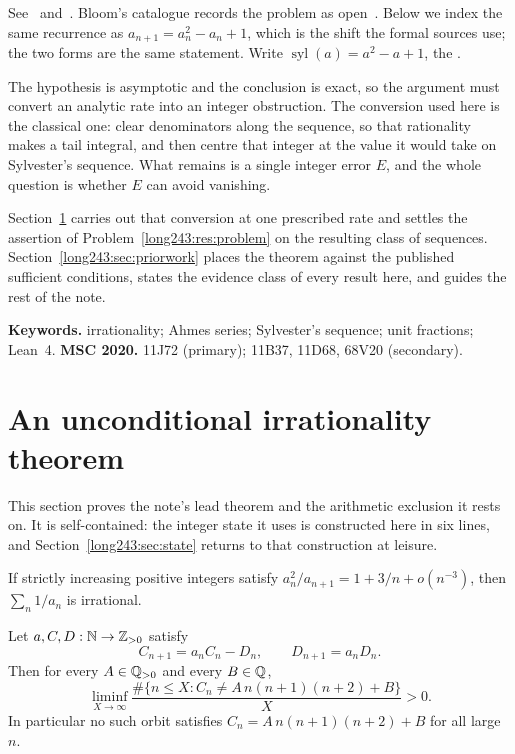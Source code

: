\documentclass[11pt]{article}
\newcommand{\sylnext}{\operatorname{syl}}
\begin{document}
\noindent See~\cite[p.~64]{erdosgraham1980} and~\cite[p.~105]{erdos1988}.
Bloom's catalogue records the problem as open~\cite{erdosproblems}.
Below we index the same recurrence as
$a_{n+1}=a_n^{2}-a_n+1$, which is the shift the formal sources use; the two
forms are the same statement.  Write $\sylnext(a)=a^{2}-a+1$, the
.

The hypothesis is asymptotic and the conclusion is exact, so the argument must
convert an analytic rate into an integer obstruction.  The conversion used here
is the classical one: clear denominators along the sequence, so that
rationality makes a tail integral, and then centre that integer at the value it
would take on Sylvester's sequence.  What remains is a single integer error
$E$, and the whole question is whether $E$ can avoid vanishing.

Section~\ref{long243:sec:cubicrate} carries out that conversion at one prescribed rate
and settles the assertion of Problem~\ref{long243:res:problem} on the resulting class
of sequences.  Section~\ref{long243:sec:priorwork} places the theorem against the
published sufficient conditions, states the evidence class of every result
here, and guides the rest of the note.

\medskip
\noindent\textbf{Keywords.} irrationality; Ahmes series; Sylvester's sequence;
unit fractions; Lean~4.
\qquad
\textbf{MSC 2020.} 11J72 (primary); 11B37, 11D68, 68V20 (secondary).

\section{An unconditional irrationality theorem}\label{long243:sec:cubicrate}

This section proves the note's lead theorem and the arithmetic exclusion it
rests on.  It is self-contained: the integer state it uses is constructed here
in six lines, and Section~\ref{long243:sec:state} returns to that construction at
leisure.

\begin{theorem}\label{long243:res:cubicrate}
If strictly increasing positive integers satisfy
$a_n^2/a_{n+1}=1+3/n+o(n^{-3})$, then $\sum_n1/a_n$ is irrational.
\end{theorem}

\begin{theorem}\label{long243:res:cubicexclusion}
Let $a,C,D:\mathbb{N}\to\mathbb{Z}_{>0}$ satisfy
\begin{equation}\label{long243:eq:cubicorbit}
 C_{n+1}=a_nC_n-D_n,\qquad D_{n+1}=a_nD_n .
\end{equation}
Then for every $A\in\mathbb{Q}_{>0}$ and every $B\in\mathbb{Q}$,
\[
 \liminf_{X\to\infty}
 \frac{\#\{n\le X:C_n\ne A\,n(n+1)(n+2)+B\}}{X}>0 .
\]
In particular no such orbit satisfies $C_n=A\,n(n+1)(n+2)+B$ for all
large $n$.
\end{theorem}
\end{document}
